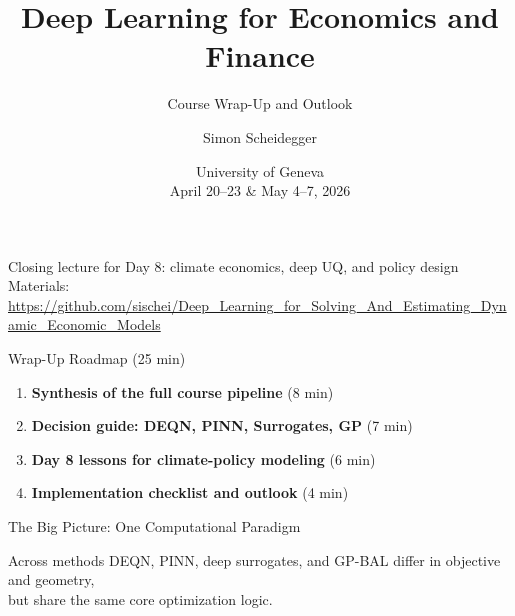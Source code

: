 \documentclass[aspectratio=169,11pt]{beamer}
\title[Deep Learning -- Geneva 2026]%
{Deep Learning for Economics and Finance}
\subtitle{Course Wrap-Up and Outlook}
\author{Simon Scheidegger}
\institute[HEC Lausanne]{HEC, University of Lausanne}
\date{University of Geneva\\April 20--23 \& May 4--7, 2026}
\begin{document}
{
\begin{frame}
\titlepage
\vspace{-0.4cm}
\begin{center}
{\footnotesize Closing lecture for Day 8: climate economics, deep UQ, and policy design}\\[4pt]
{\footnotesize Materials: \url{https://github.com/sischei/Deep_Learning_for_Solving_And_Estimating_Dynamic_Economic_Models}}
\end{center}
\end{frame}
}

\begin{frame}{Wrap-Up Roadmap (25 min)}
\begin{enumerate}
    \item \textbf{Synthesis of the full course pipeline} (8 min)
    \item \textbf{Decision guide: DEQN, PINN, Surrogates, GP} (7 min)
    \item \textbf{Day 8 lessons for climate-policy modeling} (6 min)
    \item \textbf{Implementation checklist and outlook} (4 min)
\end{enumerate}
\end{frame}

\begin{frame}{The Big Picture: One Computational Paradigm}
\begin{center}
\end{center}

\vspace{0.25cm}
\begin{block}{Across methods}
DEQN, PINN, deep surrogates, and GP-BAL differ in objective and geometry,\\
but share the same core optimization logic.
\end{block}
\end{frame}
\end{document}
